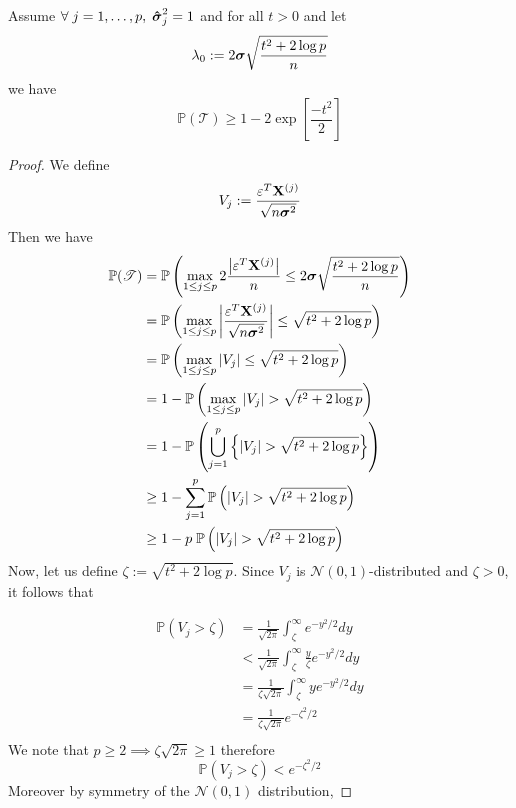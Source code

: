 \begin{lemma}
    \label{lemma: value for lambda_0}
    Assume \(\forall \; j = 1, \ldots, p, \; \boldsymbol{\hat{\sigma}}_j^2 = 1 \) and for all $t > 0$ and let
    \[
        \lambda_{0}:=2 \boldsymbol{\sigma} \sqrt{\frac{t^{2}+2 \log p}{n}}
    \]
    we have
    \[
        \mathbb{P}(\mathscr{T}) \geq 1-2 \exp \left[ \frac{-t^{2}}{2} \right]
    \]
\end{lemma}
\begin{proof}
    We define
    \[
        V_{j} := \frac{\varepsilon^{T} \mathbf{X}^{(j)}}{\sqrt{n \boldsymbol{\sigma}^{2}}}
    \]
    Then we have
    \begin{align}
        \nonumber
        \mathbb{P}(\mathscr{T})
         & = \mathbb{P} \left( \max _{1 \leq j \leq p} 2 \frac{\left| \varepsilon^{T} \mathbf{X}^{(j)}\right|}{n} \leq 2 \boldsymbol{\sigma} \sqrt{\frac{t^{2}+2 \log p}{n}}  \right) \\
        \nonumber
         & =
        \mathbb{P} \left( \max _{1 \leq j \leq p} \left| \frac{\varepsilon^{T} \mathbf{X}^{(j)}}{\sqrt{n \boldsymbol{\sigma}^{2}}} \right| \leq \sqrt{t^{2}+2 \log p}  \right)        \\
        \nonumber
         & =
        \mathbb{P} \left( \max _{1 \leq j \leq p} | V_{j} | \leq \sqrt{t^{2}+2 \log p}  \right)                                                                        \\
        \nonumber
         & = 1 - \mathbb{P} \left( \max _{1 \leq j \leq p} | V_{j} | > \sqrt{t^{2}+2 \log p}  \right)                                                                  \\
        \nonumber
         & = 1 - \mathbb{P} \left( \bigcup_{j = 1}^{p} \left\{ | V_{j} | > \sqrt{t^{2}+2 \log p}  \right\} \right)                                                     \\
        \nonumber
         & \geq 1 - \sum_{j = 1}^{p} \mathbb{P} \left( | V_{j} | > \sqrt{t^{2}+2 \log p}  \right)                                                                      \\
        \label{eqn: proof lemma 6.2.}
         & \geq 1 - p \; \mathbb{P} \left( | V_{j} | > \sqrt{t^{2}+2 \log p}  \right)
    \end{align}
    Now, let us define $\zeta := \sqrt{t^{2}+2 \log p}$. Since $V_j$ is $\mathscr{N} (0,1)$-distributed and $\zeta > 0$, it follows that

    \begin{align*}
        \mathbb{P}(V_j > \zeta) & = \frac{1}{\sqrt{2\pi}} \int_\zeta^{\infty} e^{-y^2/2} dy                   \\
                                & < \frac{1}{\sqrt{2\pi}} \int_\zeta^{\infty} \frac{y}{\zeta} e^{-y^2 / 2} dy \\
                                & = \frac{1}{\zeta \sqrt{2\pi}} \int_\zeta^{\infty} y e^{-y^2 / 2} dy         \\
                                & = \frac{1}{\zeta\sqrt{2\pi}} e^{-\zeta^2/2}                                 \\
    \end{align*}
    We note that $p \geq 2 \implies \zeta \sqrt{2 \pi} \geq 1$ therefore
    \[
        \mathbb{P}(V_j > \zeta) <  e^{-\zeta^2/2}
    \]
    Moreover by symmetry of the $\mathscr{N} (0,1)$ distribution,


\end{proof}
